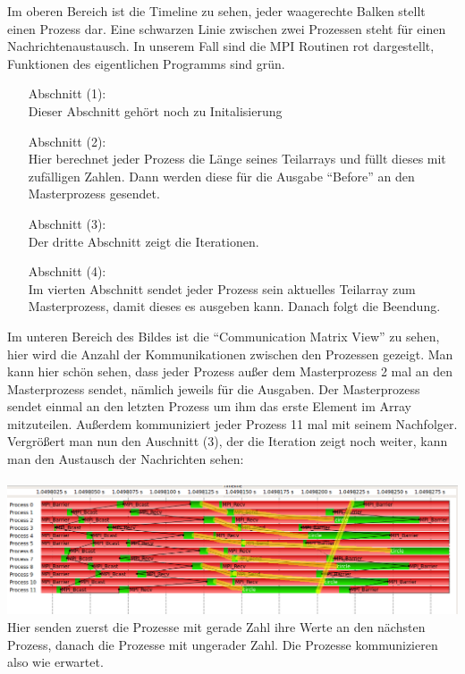 \documentclass[11pt]{article} %
\begin{document}
Im oberen Bereich ist die Timeline zu sehen, jeder waagerechte Balken stellt einen Prozess dar.
Eine schwarzen Linie zwischen zwei Prozessen steht für einen Nachrichtenaustausch.
In unserem Fall sind die MPI Routinen rot dargestellt, Funktionen des eigentlichen Programms sind grün.
\begin{enumerate}
 \item[Abschnitt (1):]~\\
Dieser Abschnitt gehört noch zu Initalisierung
\item[Abschnitt (2):]~\\
Hier berechnet jeder Prozess die Länge seines Teilarrays und füllt dieses mit zufälligen Zahlen.
Dann werden diese für die Ausgabe ``Before'' an den Masterprozess gesendet.
\item[Abschnitt (3):]~\\
Der dritte Abschnitt zeigt die Iterationen.
\item[Abschnitt (4):]~\\
Im vierten Abschnitt sendet jeder Prozess sein aktuelles Teilarray zum Masterprozess, damit dieses es ausgeben kann.
Danach folgt die Beendung.
\end{enumerate}

Im unteren Bereich des Bildes ist die ``Communication Matrix View'' zu sehen, hier wird die Anzahl der Kommunikationen zwischen den Prozessen gezeigt.
Man kann hier schön sehen, dass jeder Prozess außer dem Masterprozess 2 mal an den Masterprozess sendet, nämlich jeweils für die Ausgaben.
Der Masterprozess sendet einmal an den letzten Prozess um ihm das erste Element im Array mitzuteilen.
Außerdem kommuniziert jeder Prozess 11 mal mit seinem Nachfolger.
\newpage
Vergrößert man nun den Auschnitt (3), der die Iteration zeigt noch weiter, kann man den Austausch der Nachrichten sehen:\\
~\\
\includegraphics[width=1\textwidth]{./vampir/Nachrichtenaustausch.png}
Hier senden zuerst die Prozesse mit gerade Zahl ihre Werte an den nächsten Prozess, danach die Prozesse mit ungerader Zahl.
Die Prozesse kommunizieren also wie erwartet.
\end{document}
